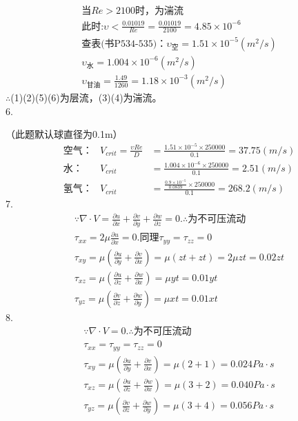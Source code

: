 \documentclass[a4paper,fleqn,twocolumn]{article}
\newcommand{\p}[2]{\frac{\partial #1}{\partial #2}}
\begin{document}
        \begin{gather*}
            \text{当}Re>2100\text{时，为湍流}\\
            \text{此时:}\upsilon<\frac{0.01019}{Re}=\frac{0.01019}{2100}=4.85\times10^{-6}\\
            \text{查表(书P534-535)：}\upsilon_空=1.51\times10^{-5}(m^2/s)\\
            \upsilon_水=1.004\times10^{-6}(m^2/s)\\
            \upsilon_{甘油}=\frac{1.49}{1260}=1.18\times10^{-3}(m^2/s)
        \end{gather*}
        $\therefore$(1)(2)(5)(6)为层流，(3)(4)为湍流。\\
    6.\par
        （此题默认球直径为0.1m）
        \begin{align*}
            \text{空气：}&V_{crit}=\frac{\upsilon Re}{D}&=\frac{1.51\times10^{-5}\times250000}{0.1}=37.75(m/s)\\
            \text{水：}&V_{crit}&=\frac{1.004\times10^{-6}\times250000}{0.1}=2.51(m/s)\\
            \text{氢气：}&V_{crit}&=\frac{\frac{0.9\times10^{-5}}{0.0839}\times250000}{0.1}=268.2(m/s)
        \end{align*}
    7.
        \begin{gather*}
            \because\nabla\cdot V=\p{u}{x}+\p{v}{y}+ \p{w}{z}=0.\therefore\text{为不可压流动}\\
            \tau_{xx}=2\mu \p{u}{x}=0.\text{同理}\tau_{yy}=\tau_{zz}=0\\
            \tau_{xy}=\mu\left( \p{u}{y}+ \p{v}{x}\right)=\mu(zt+zt)=2\mu zt=0.02zt\\
            \tau_{xz}=\mu\left( \p{u}{z}+ \p{w}{x}\right)=\mu yt=0.01yt\\
            \tau_{yz}=\mu\left( \p{v}{z}+ \p{w}{y}\right)=\mu xt=0.01xt
        \end{gather*}
    8.
    \begin{gather*}
        \because\nabla\cdot V=0.\therefore\text{为不可压流动}\\
        \tau_{xx}=\tau_{yy}=\tau_{zz}=0\\
        \tau_{xy}=\mu\left( \p{u}{y}+ \p{v}{x}\right)=\mu(2+1)=0.024{Pa\cdot s}\\
        \tau_{xz}=\mu\left( \p{u}{z}+ \p{w}{x}\right)=\mu(3+2)=0.040{Pa\cdot s}\\
        \tau_{yz}=\mu\left( \p{v}{z}+ \p{w}{y}\right)=\mu(3+4)=0.056{Pa\cdot s}
    \end{gather*}
\end{document}
